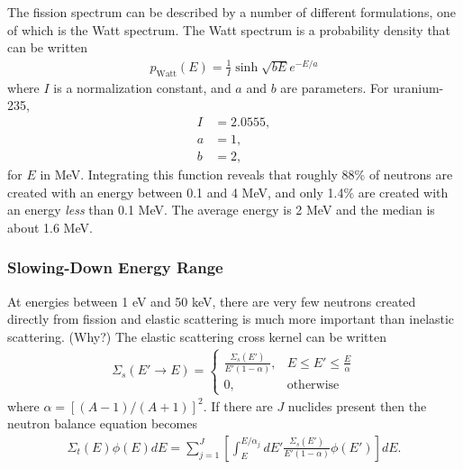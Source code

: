\documentclass[11pt]{article}
\begin{document}
The fission spectrum can be described by a number of different formulations, one of which is the Watt spectrum.  The Watt spectrum is a probability density that can be written
\begin{align}
  p_\text{Watt}(E) = \frac{1}{I} \sinh\sqrt{bE} e^{-E/a}
\end{align}
where \(I\) is a normalization constant, and \(a\) and \(b\) are parameters.  For uranium-235,
\begin{align}
  I &= 2.0555, \\
  a &= 1, \\
  b &= 2,
\end{align}
for \(E\) in MeV.  Integrating this function reveals that roughly 88\% of neutrons are created with an energy between 0.1 and 4 MeV, and only 1.4\% are created with an energy \emph{less} than 0.1 MeV.  The average energy is 2 MeV and the median is about 1.6 MeV.

\subsubsection{Slowing-Down Energy Range}
\label{sec:orgheadline28}
At energies between 1 eV and 50 keV, there are very few neutrons created directly from fission and elastic scattering is much more important than inelastic scattering.  (Why?)  The elastic scattering cross kernel can be written
\begin{align}
  \Sigma_s(E' \rightarrow E) = 
  \begin{cases}
    \frac{\Sigma_s(E')}{E'(1-\alpha)}, & E \leq E' \leq \frac{E}{\alpha} \\
    0, & \text{otherwise}
  \end{cases}
\end{align}
where \(\alpha = \left[(A-1)/(A+1)\right]^2\).  If there are \(J\) nuclides present then the neutron balance equation becomes
\begin{align}
  \Sigma_t(E) \phi(E) dE
  = \sum_{j=1}^J \left[ \int_E^{E/\alpha_j} dE' \frac{\Sigma_s(E')}{E'(1-\alpha)} \phi(E') \right] dE.
\end{align}
\end{document}
